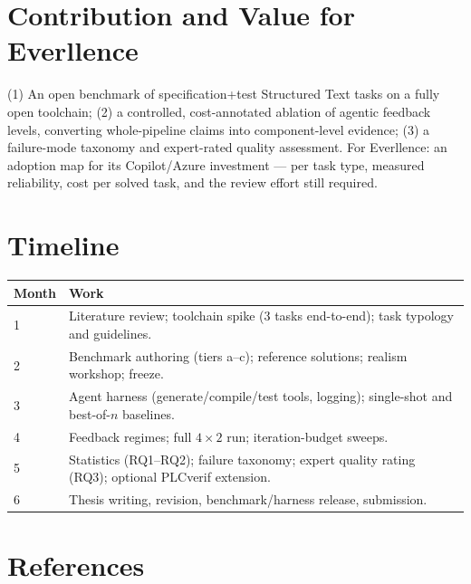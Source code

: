 \documentclass[10pt,a4paper]{article}
\begin{document}
\section{Contribution and Value for Everllence}

(1) An open benchmark of specification+test Structured Text tasks on a fully open toolchain; (2) a controlled, cost-annotated ablation of agentic feedback levels, converting whole-pipeline claims \cite{fakih2024llm4plc, liu2024agents4plc} into component-level evidence; (3) a failure-mode taxonomy and expert-rated quality assessment. For Everllence: an adoption map for its Copilot/Azure investment --- per task type, measured reliability, cost per solved task, and the review effort still required.

\section{Timeline}

{\small
\begin{tabularx}{\textwidth}{|p{1.6cm}|X|}
\hline
\rowcolor{lightgray} \textbf{Month} & \textbf{Work} \\
\hline
1 & Literature review; toolchain spike (3 tasks end-to-end); task typology and guidelines. \\
\hline
2 & Benchmark authoring (tiers a--c); reference solutions; realism workshop; freeze. \\
\hline
3 & Agent harness (generate/compile/test tools, logging); single-shot and best-of-$n$ baselines. \\
\hline
4 & Feedback regimes; full $4\times2$ run; iteration-budget sweeps. \\
\hline
5 & Statistics (RQ1--RQ2); failure taxonomy; expert quality rating (RQ3); optional PLCverif extension. \\
\hline
6 & Thesis writing, revision, benchmark/harness release, submission. \\
\hline
\end{tabularx}}

\section{References}
\end{document}
